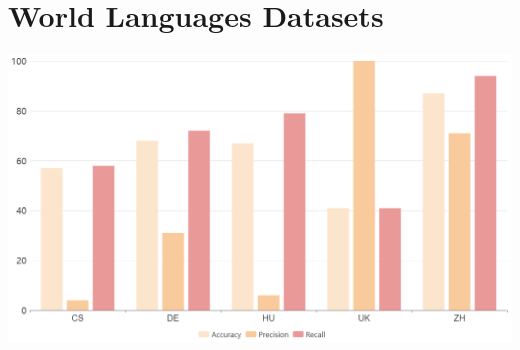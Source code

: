 \documentclass[12pt,journal,compsoc]{IEEEtran}
\begin{document}
\section{World Languages Datasets}
\begin{center}
  \includegraphics[scale=0.24]{world-languages-datasets.png}
\end{center}


\newpage %
\end{document}
